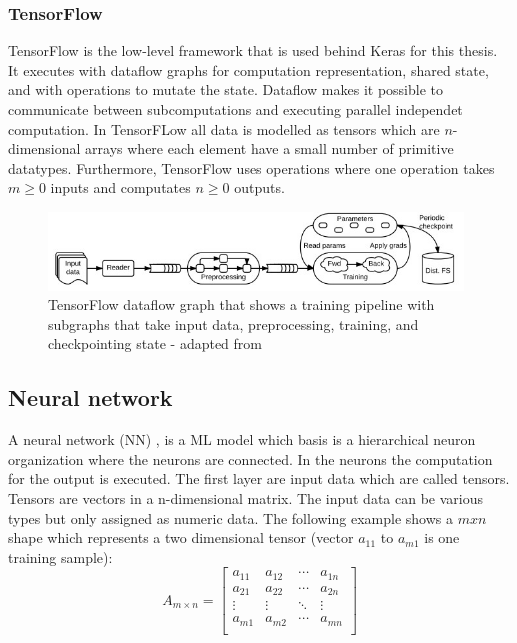 \subsubsection*{TensorFlow}

TensorFlow \cite{DBLP:journals/corr/AbadiBCCDDDGIIK16} is the low-level framework that is used behind Keras \cite{moolayil_2019} for this thesis. It executes with dataflow graphs for computation representation, shared state, and with operations to mutate the state. Dataflow makes it possible to communicate between subcomputations and executing parallel independet computation. In TensorFLow all data is modelled as tensors which are $n$-dimensional arrays where each element have a small number of primitive datatypes. Furthermore, TensorFlow uses operations where one operation takes $m \geq 0$ inputs and computates $n \geq 0$ outputs.

\begin{figure}[ht!]
  \centering
  \includegraphics[width=11cm]{pictures/tensorflow_dataflow.jpg}
  \caption{TensorFlow dataflow graph that shows a training pipeline with subgraphs that take input data, preprocessing, training, and checkpointing state - adapted from \cite{DBLP:journals/corr/AbadiBCCDDDGIIK16}}
  \label{fig:tensorflow_dataflow}
\end{figure}

\subsection{Neural network}

A neural network (NN) \cite{Maas2013RectifierNI}, \cite{DBLP:journals/corr/ZhangZLS17} is a ML model which basis is a hierarchical neuron organization where the neurons are connected. In the neurons the computation for the output is executed.
The first layer are input data which are called tensors. Tensors are vectors in a n-dimensional matrix. The input data can be various types but only assigned as numeric data. The following example shows a $m x n$ shape which represents a two dimensional tensor (vector $a_{11}$ to $a_{m1}$ is one training sample):
\[
  A_{m\times n} =
  \left[ {\begin{array}{cccc}
    a_{11} & a_{12} & \cdots & a_{1n}\\
    a_{21} & a_{22} & \cdots & a_{2n}\\
    \vdots & \vdots & \ddots & \vdots\\
    a_{m1} & a_{m2} & \cdots & a_{mn}\\
  \end{array} } \right]
\]

